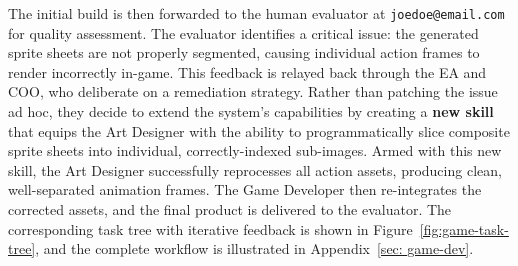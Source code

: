 \documentclass[11pt,a4paper]{article}
\begin{document}
The initial build is then forwarded to the human evaluator at \texttt{joedoe@email.com} for quality assessment. The evaluator identifies a critical issue: the generated sprite sheets are not properly segmented, causing individual action frames to render incorrectly in-game. This feedback is relayed back through the EA and COO, who deliberate on a remediation strategy. Rather than patching the issue ad hoc, they decide to extend the system's capabilities by creating a \textbf{new skill} that equips the Art Designer with the ability to programmatically slice composite sprite sheets into individual, correctly-indexed sub-images. Armed with this new skill, the Art Designer successfully reprocesses all action assets, producing clean, well-separated animation frames. The Game Developer then re-integrates the corrected assets, and the final product is delivered to the evaluator. The corresponding task tree with iterative feedback is shown in Figure~\ref{fig:game-task-tree}, and the complete workflow is illustrated in Appendix~\ref{sec: game-dev}.









\end{document}
